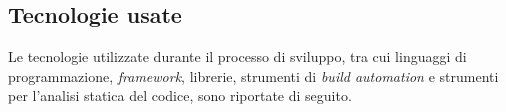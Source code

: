 \subsection{Tecnologie usate}
Le tecnologie utilizzate durante il processo di sviluppo, tra cui linguaggi di programmazione, \textit{framework}, librerie, strumenti di \textit{build automation} e strumenti per l'analisi statica del codice, sono riportate di seguito.





